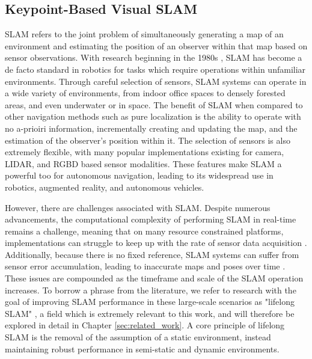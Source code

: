 \subsection{Keypoint-Based Visual SLAM}

SLAM refers to the joint problem of simultaneously generating a map of an environment and estimating the position of an observer within that map based on sensor observations. With research beginning in the 1980s \cite{smithEstimatingUncertainSpatial1988}, SLAM has become a de facto standard in robotics for tasks which require operations within unfamiliar environments. Through careful selection of sensors, SLAM systems can operate in a wide variety of environments, from indoor office spaces to densely forested areas, and even underwater or in space. The benefit of SLAM when compared to other navigation methods such as pure localization is the ability to operate with no a-prioiri information, incrementally creating and updating the map, and the estimation of the observer's position within it. The selection of sensors is also extremely flexible, with many popular implementations existing for camera, LIDAR, and RGBD based sensor modalities. These features make SLAM a powerful too for autonomous navigation, leading to its widespread use in robotics, augmented reality, and autonomous vehicles.

However, there are challenges associated with SLAM. Despite numerous advancements, the computational complexity of performing SLAM in real-time remains a challenge, meaning that on many resource constrained platforms, implementations can struggle to keep up with the rate of sensor data acquisition \cite{semenovaQuantitativeAnalysisSystem2022}. Additionally, because there is no fixed reference, SLAM systems can suffer from sensor error accumulation, leading to inaccurate maps and poses over time \cite{cadenaPresentFutureSimultaneous2016}. These issues are compounded as the timeframe and scale of the SLAM operation increases. To borrow a phrase from the literature, we refer to research with the goal of improving SLAM performance in these large-scale scenarios as "lifelong SLAM" \cite{shiAreWeReady2020}, a field which is extremely relevant to this work, and will therefore be explored in detail in Chapter \ref{sec:related_work}. A core principle of lifelong SLAM is the removal of the assumption of a static environment, instead maintaining robust performance in semi-static and dynamic environments. 


